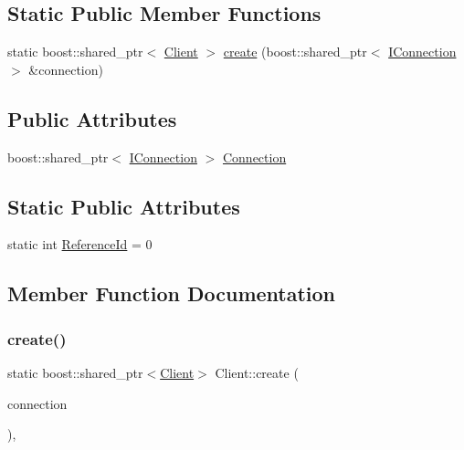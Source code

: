 \subsection*{Static Public Member Functions}
\begin{DoxyCompactItemize}
\item 
static boost\+::shared\+\_\+ptr$<$ \mbox{\hyperlink{classClient}{Client}} $>$ \mbox{\hyperlink{classClient_a3d47022bf1a2f166fe04b80e9ec2bebc}{create}} (boost\+::shared\+\_\+ptr$<$ \mbox{\hyperlink{classIConnection}{I\+Connection}} $>$ \&connection)
\end{DoxyCompactItemize}
\subsection*{Public Attributes}
\begin{DoxyCompactItemize}
\item 
boost\+::shared\+\_\+ptr$<$ \mbox{\hyperlink{classIConnection}{I\+Connection}} $>$ \mbox{\hyperlink{classClient_acf0b64183e7b92d030224c3ae9b54655}{Connection}}
\end{DoxyCompactItemize}
\subsection*{Static Public Attributes}
\begin{DoxyCompactItemize}
\item 
static int \mbox{\hyperlink{classClient_a19fc58b997c5c69c2156a493983b0652}{Reference\+Id}} = 0
\end{DoxyCompactItemize}


\subsection{Member Function Documentation}
\mbox{\label{classClient_a3d47022bf1a2f166fe04b80e9ec2bebc}} 
\subsubsection{\texorpdfstring{create()}{create()}}
{\footnotesize\ttfamily static boost\+::shared\+\_\+ptr$<$\mbox{\hyperlink{classClient}{Client}}$>$ Client\+::create (\begin{DoxyParamCaption}\item[{boost\+::shared\+\_\+ptr$<$ \mbox{\hyperlink{classIConnection}{I\+Connection}} $>$ \&}]{connection }\end{DoxyParamCaption})\hspace{0.3cm}{\ttfamily [inline]}, {\ttfamily [static]}}

